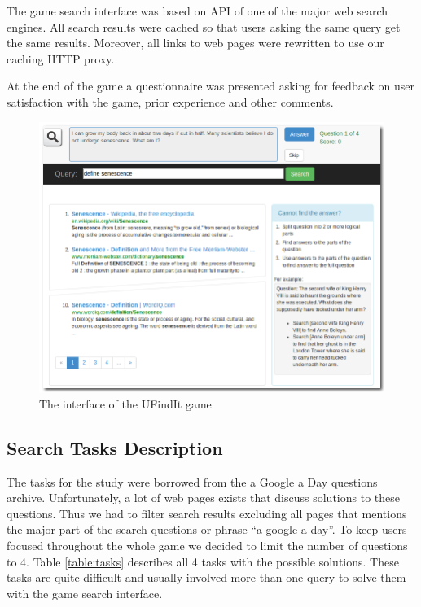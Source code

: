 \documentclass{sig-alternate}
\begin{document}
The game search interface was based on API of one of the major web search engines. All search results were cached so that users asking the same query get the same results. Moreover, all links to web pages were rewritten to use our caching HTTP proxy.

At the end of the game a questionnaire was presented asking for feedback on user satisfaction with the game, prior experience and other comments.

\begin{figure}
\centering
\includegraphics[scale=0.29]{img/ufindit}
\caption{The interface of the UFindIt game}
\label{figure:ufindit}
\end{figure}

\subsection{Search Tasks Description}

The tasks for the study were borrowed from the a Google a Day questions archive. Unfortunately, a lot of web pages exists that discuss solutions to these questions. Thus we had to filter search results excluding all pages that mentions the major part of the search questions or phrase ``a google a day''.
To keep users focused throughout the whole game we decided to limit the number of questions to 4.
Table \ref{table:tasks} describes all 4 tasks with the possible solutions. These tasks are quite difficult and usually involved more than one query to solve them with the game search interface.
\end{document}
